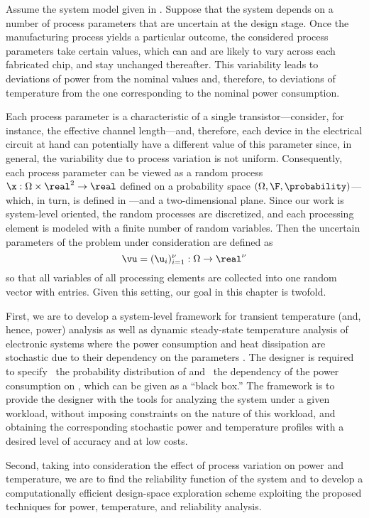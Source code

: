 Assume the system model given in . Suppose that the system
depends on a number of process parameters that are uncertain at the design
stage. Once the manufacturing process yields a particular outcome, the
considered process parameters take certain values, which can and are likely to
vary across each fabricated chip, and stay unchanged thereafter. This
variability leads to deviations of power from the nominal values and, therefore,
to deviations of temperature from the one corresponding to the nominal power
consumption.

Each process parameter is a characteristic of a single transistor---consider,
for instance, the effective channel length---and, therefore, each device in the
electrical circuit at hand can potentially have a different value of this
parameter since, in general, the variability due to process variation is not
uniform. Consequently, each process parameter can be viewed as a random process
$\x: \Omega \times \real^2 \to \real$ defined on a probability space $(\Omega,
\F, \probability)$---which, in turn, is defined in
---and a two-dimensional plane. Since our work is
system-level oriented, the random processes are discretized, and each processing
element is modeled with a finite number of random variables. Then the uncertain
parameters of the problem under consideration are defined as
\[
  \vu = (\u_i)_{i = 1}^\nu: \Omega \to \real^\nu
\]
so that all variables of all processing elements are collected into one random
vector with \nu entries. Given this setting, our goal in this chapter is
twofold.

First, we are to develop a system-level framework for transient temperature
(and, hence, power) analysis as well as dynamic steady-state temperature
analysis of electronic systems where the power consumption and heat dissipation
are stochastic due to their dependency on the parameters \vu. The designer is
required to specify \one~the probability distribution of \vu and \two~the
dependency of the power consumption on \vu, which can be given as a ``black
box.'' The framework is to provide the designer with the tools for analyzing the
system under a given workload, without imposing constraints on the nature of
this workload, and obtaining the corresponding stochastic power \mp and
temperature \mq profiles with a desired level of accuracy and at low costs.

Second, taking into consideration the effect of process variation on power and
temperature, we are to find the reliability function of the system and to
develop a computationally efficient design-space exploration scheme exploiting
the proposed techniques for power, temperature, and reliability analysis.
